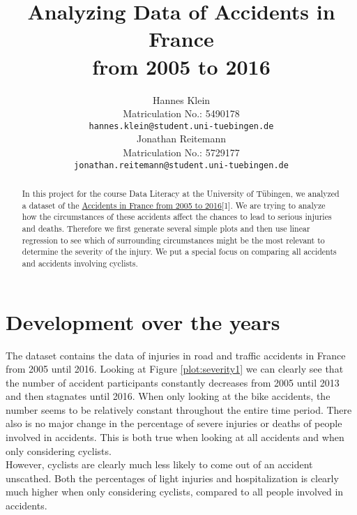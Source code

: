 \documentclass{article}
\title{Analyzing Data of Accidents in France\\ from 2005 to 2016}
\author{%
  Hannes Klein\\
  Matriculation No.: 5490178\\
 \texttt{hannes.klein@student.uni-tuebingen.de}\\
  \And
  Jonathan Reitemann\\
  Matriculation No.: 5729177 \\
  \texttt{jonathan.reitemann@student.uni-tuebingen.de}\\
}
\begin{document}
\maketitle

\begin{abstract}
  In this project for the course Data Literacy at the University of Tübingen, we analyzed a dataset of the \href{https://www.kaggle.com/ahmedlahlou/accidents-in-france-from-2005-to-2016?select=caracteristics.csv}{Accidents in France from 2005 to 2016}[1]. We are trying to analyze how the circumstances of these accidents affect the chances to lead to serious injuries and deaths. Therefore we first generate several simple plots and then use linear regression to see which of surrounding circumstances might be the most relevant to determine the severity of the injury. We put a special focus on comparing all accidents and accidents involving cyclists.
\end{abstract}

\section{Development over the years}

\iffalse
The first observation that is noticeable when looking at this dataset, is the number of people involved in accidents per year went down\ref{plot:severity1}. When we are looking at the severity of injuries we are also looking at a significant drop in all categories. The obvious question to ask is why the number of accidents went down and if we can find out with this dataset. For example the dataset tells us if an accident was near a bike lane but it doesn't tell us how many streets in France in total have bike lanes. 
\fi

The dataset contains the data of injuries in road and traffic accidents in France from 2005 until 2016. Looking at Figure \ref{plot:severity1} we can clearly see that the number of accident participants constantly decreases from 2005 until 2013 and then stagnates until 2016. When only looking at the bike accidents, the number seems to be relatively constant throughout the entire time period. There also is no major change in the percentage of severe injuries or deaths of people involved in accidents. This is both true when looking at all accidents and when only considering cyclists.\\

However, cyclists are clearly much less likely to come out of an accident unscathed. Both the percentages of light injuries and hospitalization is clearly much higher when only considering cyclists, compared to all people involved in accidents.
\end{document}
